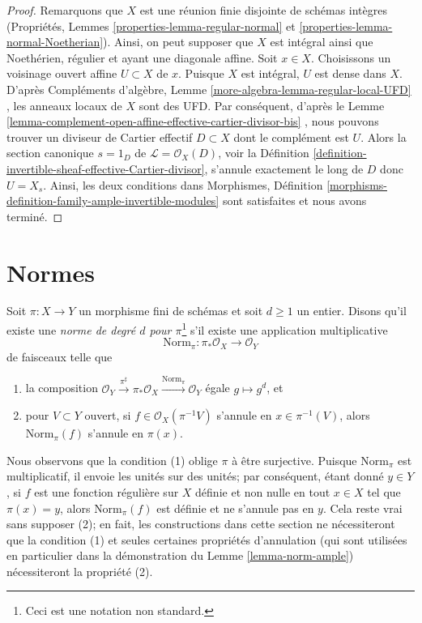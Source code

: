 \begin{proof}
Remarquons que  $X$  est une réunion finie disjointe de schémas intègres
(Propriétés, Lemmes  \ref{properties-lemma-regular-normal}  et  \ref{properties-lemma-normal-Noetherian}). Ainsi, on peut supposer que
 $X$  est intégral ainsi que Noethérien, régulier et ayant une diagonale
affine. Soit  $x \in X$. Choisissons un voisinage ouvert affine  $U \subset X$  de
 $x$. Puisque  $X$  est intégral,  $U$  est dense dans
 $X$. D'après Compléments d'algèbre, Lemme  \ref{more-algebra-lemma-regular-local-UFD} , les anneaux locaux de
 $X$  sont des UFD. Par conséquent, d'après le Lemme  \ref{lemma-complement-open-affine-effective-cartier-divisor-bis} , nous
pouvons trouver un diviseur de Cartier effectif  $D \subset X$  dont le complément
est  $U$. Alors la section canonique  $s = 1_D$  de  $\mathcal{L} = \mathcal{O}_X(D)$, voir la
Définition  \ref{definition-invertible-sheaf-effective-Cartier-divisor}, s'annule exactement le long de  $D$  donc
 $U = X_s$. Ainsi, les deux conditions dans Morphismes, Définition  \ref{morphisms-definition-family-ample-invertible-modules} 
sont satisfaites et nous avons terminé.
\end{proof}




\section{Normes}
\label{section-norms}

\noindent
Soit  $\pi : X \to Y$  un morphisme fini de schémas et soit  $d \geq 1$  un entier.
Disons qu'il existe une  {\it  norme de degré  $d$  pour
 $\pi$}\footnote{Ceci est une notation non
standard.}  s'il existe une application multiplicative
$$
\text{Norm}_\pi : \pi_*\mathcal{O}_X \to \mathcal{O}_Y
$$
de faisceaux telle que
\begin{enumerate}
\item la composition  $\mathcal{O}_Y \xrightarrow{\pi^\sharp} \pi_*\mathcal{O}_X
\xrightarrow{\text{Norm}_\pi} \mathcal{O}_Y$  égale  $g \mapsto g^d$, et
\item pour  $V \subset Y$  ouvert, si  $f \in \mathcal{O}_X(\pi^{-1}V)$  s'annule en  $x \in \pi^{-1}(V)$, alors
 $\text{Norm}_\pi(f)$  s'annule en  $\pi(x)$.
\end{enumerate}
Nous observons que la condition (1) oblige  $\pi$  à être surjective. Puisque
 $\text{Norm}_\pi$  est multiplicatif, il envoie les unités sur des unités; par
conséquent, étant donné  $y \in Y$, si  $f$  est une fonction régulière sur
 $X$  définie et non nulle en tout  $x \in X$  tel que  $\pi(x) = y$,
alors  $\text{Norm}_\pi(f)$  est définie et ne s'annule pas en  $y$. Cela reste vrai
sans supposer (2); en fait, les constructions dans cette section ne nécessiteront que
la condition (1) et seules certaines propriétés d'annulation (qui sont utilisées
en particulier dans la démonstration du Lemme  \ref{lemma-norm-ample}) nécessiteront la
propriété (2).

